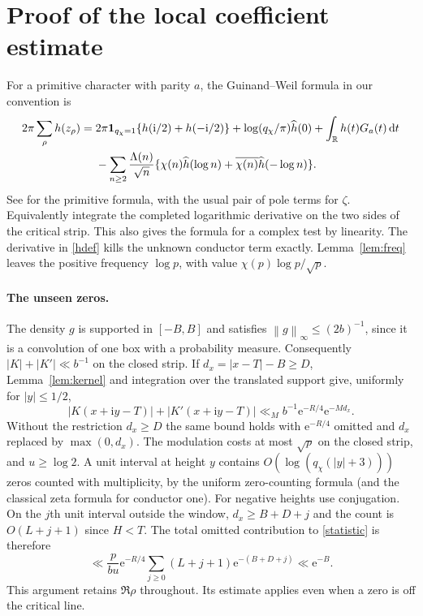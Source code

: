 \documentclass[11pt]{article}
\newcommand{\R}{\mathbb R}
\newcommand{\ee}{\mathrm e}
\newcommand{\ii}{\mathrm i}
\newcommand{\dd}{\,\mathrm d}
\newcommand{\wh}{\widehat}
\newcommand{\norm}[1]{\left\lVert#1\right\rVert}
\begin{document}
\section{Proof of the local coefficient estimate}
For a primitive character with parity $a$, the Guinand--Weil formula in our convention is
\begin{align}
 2\pi\sum_\rho h(z_\rho)
   ={}&2\pi\mathbf 1_{q_\chi=1}\{h(\ii/2)+h(-\ii/2)\}
         +\log(q_\chi/\pi)\wh h(0)+\int_\R h(t)G_a(t)\dd t\notag\\
   &-\sum_{n\ge2}\frac{\Lambda(n)}{\sqrt n}
    \{\chi(n)\wh h(\log n)+\overline{\chi(n)}\wh h(-\log n)\}.
 \label{explicit}
\end{align}
See \cite[\S2.1, formula (2.1)]{Chirre} for the primitive formula, with the usual pair of pole terms for $\zeta$. Equivalently integrate the completed logarithmic derivative on the two sides of the critical strip. This also gives the formula for a complex test by linearity. The derivative in \eqref{hdef} kills the unknown conductor term exactly. Lemma~\ref{lem:freq} leaves the positive frequency $\log p$, with value $\chi(p)\log p/\sqrt p$.

\paragraph{The unseen zeros.}
The density $g$ is supported in $[-B,B]$ and satisfies
$\norm{g}_\infty\le(2b)^{-1}$, since it is a convolution of one box with a probability measure. Consequently $|K|+|K'|\ll b^{-1}$ on the closed strip. If $d_x=|x-T|-B\ge D$, Lemma~\ref{lem:kernel} and integration over the translated support give, uniformly for $|y|\le1/2$,
\[
 |K(x+\ii y-T)|+|K'(x+\ii y-T)|
 \ll_M b^{-1}\ee^{-R/4}\ee^{-M d_x}.
\]
Without the restriction $d_x\ge D$ the same bound holds with
$\ee^{-R/4}$ omitted and $d_x$ replaced by $\max(0,d_x)$. The modulation costs at most $\sqrt p$ on the closed strip, and $u\ge\log2$. A unit interval at height $y$ contains $O(\log(q_\chi(|y|+3)))$ zeros counted with multiplicity, by the uniform zero-counting formula \cite{Bennett} (and the classical zeta formula for conductor one). For negative heights use conjugation. On the $j$th unit interval outside the window, $d_x\ge B+D+j$ and the count is $O(L+j+1)$ since $H<T$. The total omitted contribution to \eqref{statistic} is therefore
\[
 \ll \frac{p}{bu}\ee^{-R/4}
       \sum_{j\ge0}(L+j+1)\ee^{-(B+D+j)}\ll \ee^{-B}.
\]
This argument retains $\Re\rho$ throughout. Its estimate applies even when a zero is off the critical line.
\end{document}
